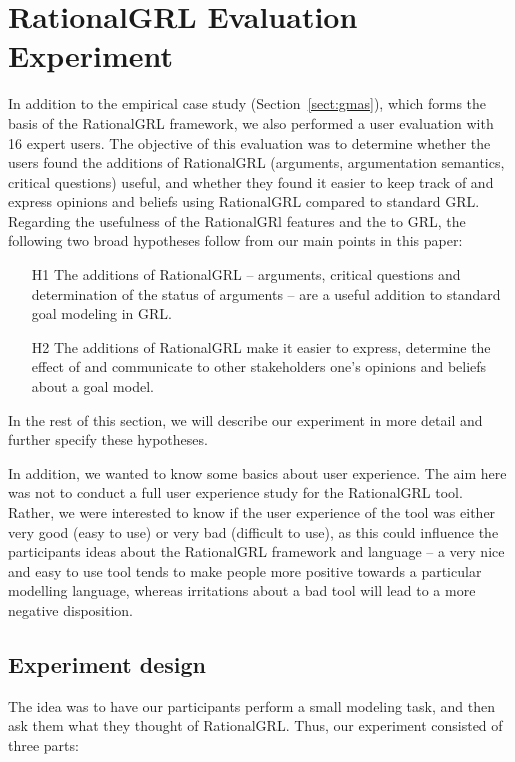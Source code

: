 \section{RationalGRL Evaluation Experiment}
\label{sect:validation}

In addition to the empirical case study (Section~\ref{sect:gmas}), which forms the basis of the RationalGRL framework, we also performed a user evaluation with 16 expert users. The objective of this evaluation was to determine whether the users found the additions of RationalGRL (arguments, argumentation semantics, critical questions) useful, and whether they found it easier to keep track of and express opinions and beliefs using RationalGRL compared to standard GRL. Regarding the usefulness of the RationalGRl features and the to GRL, the following two broad hypotheses follow from our main points in this paper:

\begin{itemize}
\item[H1] The additions of RationalGRL -- arguments, critical questions and determination of the status of arguments -- are a useful addition to standard goal modeling in GRL.
\item[H2] The additions of RationalGRL make it easier to express, determine the effect of and communicate to other stakeholders one's opinions and beliefs about a goal model.
\end{itemize}

In the rest of this section, we will describe our experiment in more detail and further specify these hypotheses.

In addition, we wanted to know some basics about user experience. The aim here was not to conduct a full user experience study for the RationalGRL tool. Rather, we were interested to know if the user experience of the tool was either very good (easy to use) or very bad (difficult to use), as this could influence the participants ideas about the RationalGRL framework and language -- a very nice and easy to use tool tends to make people more positive towards a particular modelling language, whereas irritations about a bad tool will lead to a more negative disposition. 

\subsection{Experiment design}

The idea was to have our participants perform a small modeling task, and then ask them what they thought of RationalGRL. Thus, our experiment consisted of three parts:


